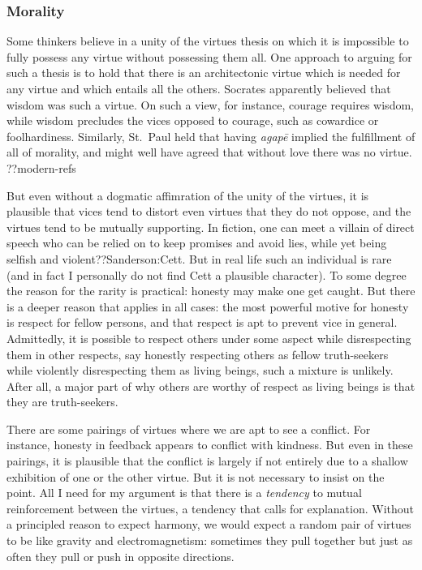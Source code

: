 \subsubsection{Morality}
Some thinkers believe in a unity of the virtues thesis on which it is impossible to fully possess any virtue 
without possessing them all. One approach to arguing for such a thesis is to hold that there is an architectonic 
virtue which is needed for any virtue and which entails all the others. Socrates apparently believed that wisdom 
was such a virtue. On such a view, for instance, courage requires wisdom, while wisdom precludes the vices opposed 
to courage, such as cowardice or foolhardiness. Similarly, St.~Paul held that having \textit{agap\={e}} implied the 
fulfillment of all of morality, and might well have agreed that without love there was no virtue. ??modern-refs

But even without a dogmatic affimration of the unity of the virtues, it is plausible that vices tend to distort even 
virtues that they do not oppose, and the virtues tend to be mutually supporting. In fiction, one can meet a villain 
of direct speech who can be relied on to keep promises and avoid lies, while yet being selfish and violent??Sanderson:Cett. 
But in real life such an individual is rare (and in fact I personally do not find Cett a plausible character). To some degree 
the reason for the rarity is practical: honesty may make 
one get caught. But there is a deeper reason that applies in all cases: the most powerful motive for honesty is respect 
for fellow persons, and that respect is apt to prevent vice in general. Admittedly, it is possible to respect others 
under some aspect while disrespecting them in other respects, say honestly respecting others as fellow truth-seekers 
while violently disrespecting them as living beings, such a mixture is unlikely. After all, a major part of why others 
are worthy of respect as living beings is that they are truth-seekers.

There are some pairings of virtues where we are apt to see a conflict. For instance, honesty in feedback appears to 
conflict with kindness. But even in these pairings, it is plausible that the conflict is largely if not entirely
due to a shallow exhibition of one or the other virtue. But it is not necessary to insist on the point. All I need 
for my argument is that there is a \textit{tendency} to mutual reinforcement between the virtues, a tendency that 
calls for explanation. Without a principled reason to expect harmony, we would expect a random pair of virtues to be 
like gravity and electromagnetism: sometimes they pull together but just as often they pull or push in opposite 
directions.

